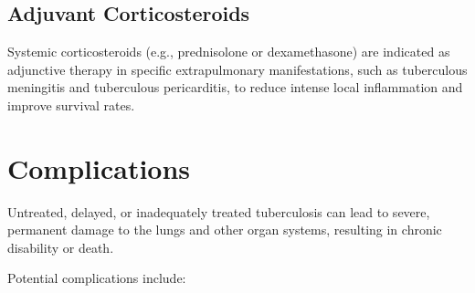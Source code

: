 \subsection*{Adjuvant Corticosteroids}
Systemic corticosteroids (e.g., prednisolone or dexamethasone) are indicated as adjunctive therapy in specific extrapulmonary manifestations, such as tuberculous meningitis and tuberculous pericarditis, to reduce intense local inflammation and improve survival rates.

\section*{Complications}
Untreated, delayed, or inadequately treated tuberculosis can lead to severe, permanent damage to the lungs and other organ systems, resulting in chronic disability or death.

Potential complications include:

